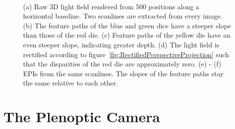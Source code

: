 \begin{figure}[tb]
	\subcaptionbox{\label{fig:epi_1x500x1000x1000_overview}}{}\hfill%
	\subcaptionbox{\label{fig:epi_1x500x1000x1000_scanline1}}{}\hfill%
	\subcaptionbox{\label{fig:epi_1x500x1000x1000_scanline2}}{}
	\\
	\subcaptionbox{\label{fig:epi_1x500x1000x1000_overview_rectified}}{}\hfill%
	\subcaptionbox{\label{fig:epi_1x500x1000x1000_scanline1_rectified}}{}\hfill%
	\subcaptionbox{\label{fig:epi_1x500x1000x1000_scanline2_rectified}}{}\hfill%
	\caption[Visualization of the light field with epipolar plane images]
			{(a) Raw 3D light field rendered from 500 positions along a horizontal baseline.
				 Two scanlines are extracted from every image. 
			 (b) The feature paths of the blue and green dice have a steeper slope than those of the red die.
			 (c) Feature paths of the yellow die have an even steeper slope, indicating greater depth.
			 (d) The light field is rectified according to figure~\ref{fig:RectifiedPerspectiveProjection} such that the disparities of the red die are approximately zero.
			 (e) - (f) EPIs from the same scanlines. The slopes of the feature paths stay the same relative to each other. }
	\label{fig:epi_example_perspective}
\end{figure}

\section{The Plenoptic Camera}
\label{sec:plenoptic_camera}

